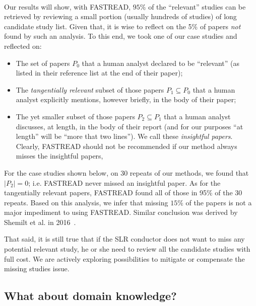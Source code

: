 \documentclass{svjour3}
\theoremstyle{break}
\newcommand{\respto}[1]{
\fcolorbox{black}{black!15}{
\label{response:#1}
\bf
  \scriptsize R-{#1}}~
}
\begin{document}
\respto{1b2}
Our results will show, with FASTREAD, $95\%$ of the ``relevant'' studies can be retrieved by reviewing a small portion (usually hundreds of studies) of long candidate study list. Given that, it is wise to reflect
on the 5\% of papers {\em not} found by such an analysis. To this end, we took one of our case studies and reflected on:
\begin{itemize}
\item The set of papers $P_0$ that a human analyst declared to be ``relevant'' (as listed in their reference list at the end of their paper);
\item The {\em tangentially relevant} subset of those  papers $P_1 \subseteq P_0$ that a human analyst explicitly mentions, however briefly, in the body of their paper;
\item The yet smaller subset of those papers $P_2 \subseteq P_1$  that a human analyst discusses, at length, in the body of their report (and for
our purposes ``at length'' will be ``more that two lines''). We call these {\em insightful papers}. Clearly, FASTREAD should not be recommended if our method always misses the insightful papers, 
\end{itemize}
For the case studies shown below, on 30 repeats of our methods, we found that $|P_2|=0$; i.e. FASTREAD never missed an insightful paper. As for the tangentially
relevant papers, FASTREAD found all of those in 95\% of the 30 repeats. 
Based on this analysis, we infer that missing  $15\%$ of the papers is not a major impediment to using FASTREAD. Similar conclusion was derived by Shemilt et al. in 2016~\cite{shemilt2016use}.

That said, it is still true that if the SLR conductor does not want to miss any potential relevant study, he or she need to review all the candidate studies with full cost. We are actively exploring possibilities to mitigate or compensate the missing studies issue. 


 

\subsection{What about domain knowledge?}
\end{document}
